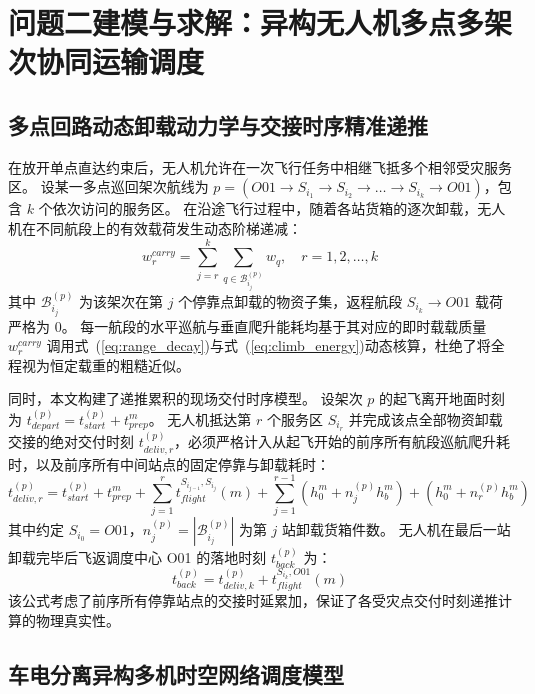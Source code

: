 \section{问题二建模与求解：异构无人机多点多架次协同运输调度}

\subsection{多点回路动态卸载动力学与交接时序精准递推}

在放开单点直达约束后，无人机允许在一次飞行任务中相继飞抵多个相邻受灾服务区。
设某一多点巡回架次航线为 $p = (O01 \to S_{i_1} \to S_{i_2} \to \dots \to S_{i_k} \to O01)$，包含 $k$ 个依次访问的服务区。
在沿途飞行过程中，随着各站货箱的逐次卸载，无人机在不同航段上的有效载荷发生动态阶梯递减：
\begin{equation}
    w_r^{carry} = \sum_{j=r}^{k} \sum_{q \in \mathcal{B}_{i_j}^{(p)}} w_q, \quad r = 1, 2, \dots, k
    \label{eq:carry_weight}
\end{equation}
其中 $\mathcal{B}_{i_j}^{(p)}$ 为该架次在第 $j$ 个停靠点卸载的物资子集，返程航段 $S_{i_k} \to O01$ 载荷严格为 0。
每一航段的水平巡航与垂直爬升能耗均基于其对应的即时载载质量 $w_r^{carry}$ 调用式~(\ref{eq:range_decay})与式~(\ref{eq:climb_energy})动态核算，杜绝了将全程视为恒定载重的粗糙近似。

同时，本文构建了递推累积的现场交付时序模型。
设架次 $p$ 的起飞离开地面时刻为 $t_{depart}^{(p)} = t_{start}^{(p)} + t_{prep}^m$。
无人机抵达第 $r$ 个服务区 $S_{i_r}$ 并完成该点全部物资卸载交接的绝对交付时刻 $t_{deliv, r}^{(p)}$，必须严格计入从起飞开始的前序所有航段巡航爬升耗时，以及前序所有中间站点的固定停靠与卸载耗时：
\begin{equation}
    t_{deliv, r}^{(p)} = t_{start}^{(p)} + t_{prep}^m + \sum_{j=1}^{r} t_{flight}^{S_{i_{j-1}}, S_{i_j}}(m) + \sum_{j=1}^{r-1} \left(h_0^m + n_j^{(p)} h_b^m\right) + \left(h_0^m + n_r^{(p)} h_b^m\right)
    \label{eq:deliv_time}
\end{equation}
其中约定 $S_{i_0} = O01$，$n_j^{(p)} = |\mathcal{B}_{i_j}^{(p)}|$ 为第 $j$ 站卸载货箱件数。
无人机在最后一站卸载完毕后飞返调度中心 O01 的落地时刻 $t_{back}^{(p)}$ 为：
\begin{equation}
    t_{back}^{(p)} = t_{deliv, k}^{(p)} + t_{flight}^{S_{i_k}, O01}(m)
    \label{eq:back_time}
\end{equation}
该公式考虑了前序所有停靠站点的交接时延累加，保证了各受灾点交付时刻递推计算的物理真实性。

\subsection{车电分离异构多机时空网络调度模型}

